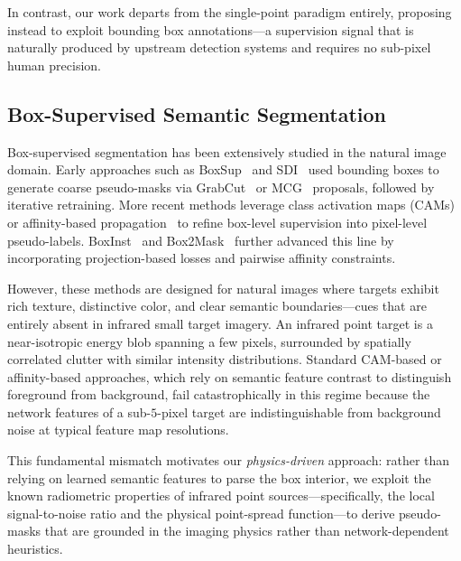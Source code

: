 In contrast, our work departs from the single-point paradigm entirely, proposing instead to exploit bounding box annotations---a supervision signal that is naturally produced by upstream detection systems and requires no sub-pixel human precision.

\subsection{Box-Supervised Semantic Segmentation}\label{sec:related_box}

Box-supervised segmentation has been extensively studied in the natural image domain.
Early approaches such as BoxSup~\cite{boxsup} and SDI~\cite{sdi} used bounding boxes to generate coarse pseudo-masks via GrabCut~\cite{grabcut} or MCG~\cite{mcg} proposals, followed by iterative retraining.
More recent methods leverage class activation maps (CAMs)~\cite{cam} or affinity-based propagation~\cite{affinitynet} to refine box-level supervision into pixel-level pseudo-labels.
BoxInst~\cite{boxinst} and Box2Mask~\cite{box2mask} further advanced this line by incorporating projection-based losses and pairwise affinity constraints.

However, these methods are designed for natural images where targets exhibit rich texture, distinctive color, and clear semantic boundaries---cues that are entirely absent in infrared small target imagery.
An infrared point target is a near-isotropic energy blob spanning a few pixels, surrounded by spatially correlated clutter with similar intensity distributions.
Standard CAM-based or affinity-based approaches, which rely on semantic feature contrast to distinguish foreground from background, fail catastrophically in this regime because the network features of a sub-$5$-pixel target are indistinguishable from background noise at typical feature map resolutions.

This fundamental mismatch motivates our \emph{physics-driven} approach: rather than relying on learned semantic features to parse the box interior, we exploit the known radiometric properties of infrared point sources---specifically, the local signal-to-noise ratio and the physical point-spread function---to derive pseudo-masks that are grounded in the imaging physics rather than network-dependent heuristics.
